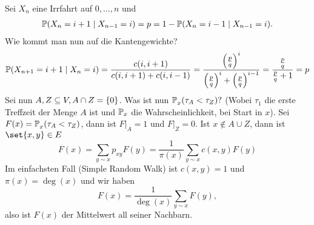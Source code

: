 \begin{beispiel} 
	Sei $X_n$ eine Irrfahrt auf $0, \dots, n$ und	
	\begin{gather}
		\prop{X_n = i+1 \given X_{n-1} = i} = p = 1 - \prop{X_n = i-1 \given X_{n-1} = i}.
	\end{gather}
	Wie kommt man nun auf die Kantengewichte?
	\begin{gather}
		\prop{X_{n+1} = i+1 \given X_n = i} = \frac{c(i,i+1)}{c(i,i+1)+c(i,i-1)} = \frac{\enb{\frac{p}{q}}^i}{\enb{\frac{p}{q}}^i + \enb{\frac{p}{q}}^{i-1}} = \frac{\frac{p}{q}}{\frac{p}{q} +1} = p
	\end{gather}
	Sei nun $A,Z \subseteq V, A \cap Z = \{0\}$. Was ist nun $\prop{\tau_A < \tau_Z}[][x]?$ (Wobei $\tau_1$ die erste Treffzeit der Menge $A$ ist und $\mathbb{P}_x$ die Wahrscheinlichkeit, bei Start in $x$). Sei $F(x) = \prop{\tau_A < \tau_Z}[][x]$, dann ist $F|_A = 1$ und $F|_Z = 0$. Ist $x \notin A \cup Z$, dann ist $\set{x,y} \in E$ 
	\begin{equation}
		F(x) = \sum\limits_{y \sim x} p_{xy} F(y) = \frac{1}{\pi(x)} \sum\limits_{y \sim x} c(x,y)F(y) \tag{*} \label{eqn:GamblersRun}
	\end{equation}
	Im einfachsten Fall (Simple Random Walk) ist $c(x,y) = 1$ und $\pi(x) = \deg(x)$  und wir haben
	\begin{equation}
		F(x) = \frac{1}{\deg(x)} \sum\limits_{y \sim x} F(y),
	\end{equation}
	also ist $F(x)$ der Mittelwert all seiner Nachbarn. 
\end{beispiel}

